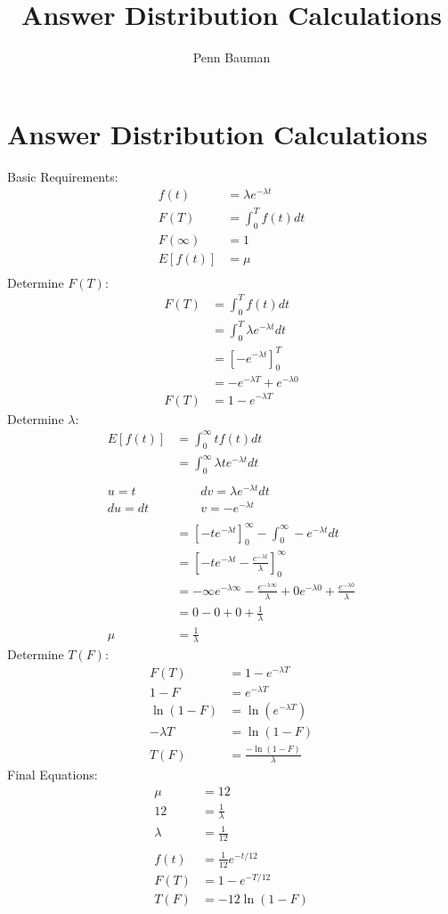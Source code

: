 \documentclass[12pt]{article}
\author{Penn Bauman}
\title{Answer Distribution Calculations}
\begin{document}
\section{Answer Distribution Calculations}

Basic Requirements:
\begin{align*}
	f(t) &= \lambda e^{-\lambda t} \\
	F(T) &= \int_{0}^{T} f(t) dt \\
	F(\infty) &= 1 \\
	E[f(t)] &= \mu \\
\end{align*}
Determine $F(T)$:
\begin{align*}
	F(T) &= \int_{0}^{T} f(t) dt \\
		&= \int_{0}^{T} \lambda e^{-\lambda t} dt \\
		&= \left[-e^{-\lambda t}\right]_{0}^{T} \\
		&= -e^{-\lambda T} + e^{-\lambda 0} \\
	F(T) &= 1 - e^{-\lambda T}
\end{align*}
Determine $\lambda$:
\begin{align*}
	E[f(t)] &= \int_{0}^{\infty} t f(t) dt \\
		&= \int_{0}^{\infty} \lambda t e^{-\lambda t} dt \\
		\\
	u = t & \ \ \ \ \ \ \ \ \ dv = \lambda e^{-\lambda t} dt \\
	du  =  dt & \ \ \ \ \ \ \ \ \ v = -e^{-\lambda t} \\
		\\
		&= \left[-t e^{-\lambda t}\right]_{0}^{\infty} - \int_{0}^{\infty} - e^{-\lambda t} dt \\
		&= \left[-t e^{-\lambda t} - \frac{e^{-\lambda t}}{\lambda}\right]_{0}^{\infty} \\
		&= -\infty e^{-\lambda \infty} - \frac{e^{-\lambda \infty}}{\lambda}
		+ 0 e^{-\lambda 0} + \frac{e^{-\lambda 0}}{\lambda} \\
		&= 0 - 0 + 0 + \frac{1}{\lambda} \\
	\mu &= \frac{1}{\lambda}
\end{align*}
Determine $T(F)$:
\begin{align*}
	F(T) &= 1 - e^{-\lambda T} \\
	1 - F &= e^{-\lambda T} \\
	\ln(1 - F) &= \ln(e^{-\lambda T}) \\
	-\lambda T &= \ln(1 - F) \\
	T(F) &= \frac{-\ln(1 - F)}{\lambda}
\end{align*}
Final Equations:
\begin{align*}
	\mu &= 12 \\
	12 &= \frac{1}{\lambda} \\
	\lambda &= \frac{1}{12} \\
	\\
	f(t) &= \frac{1}{12} e^{-t/12} \\
	F(T) &= 1 - e^{-T/12} \\
	T(F) &= -12 \ln(1 - F)
\end{align*}
\end{document}
